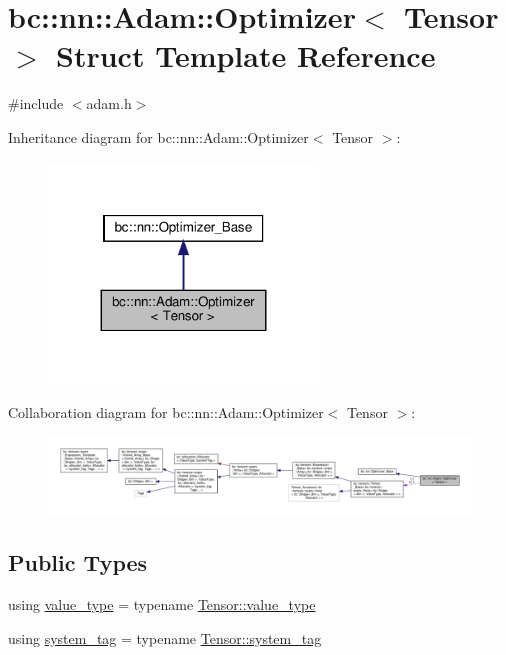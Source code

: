 \hypertarget{structbc_1_1nn_1_1Adam_1_1Optimizer}{}\section{bc\+:\+:nn\+:\+:Adam\+:\+:Optimizer$<$ Tensor $>$ Struct Template Reference}
\label{structbc_1_1nn_1_1Adam_1_1Optimizer}


{\ttfamily \#include $<$adam.\+h$>$}



Inheritance diagram for bc\+:\+:nn\+:\+:Adam\+:\+:Optimizer$<$ Tensor $>$\+:\nopagebreak
\begin{figure}[H]
\begin{center}
\leavevmode
\includegraphics[width=203pt]{structbc_1_1nn_1_1Adam_1_1Optimizer__inherit__graph}
\end{center}
\end{figure}


Collaboration diagram for bc\+:\+:nn\+:\+:Adam\+:\+:Optimizer$<$ Tensor $>$\+:\nopagebreak
\begin{figure}[H]
\begin{center}
\leavevmode
\includegraphics[width=350pt]{structbc_1_1nn_1_1Adam_1_1Optimizer__coll__graph}
\end{center}
\end{figure}
\subsection*{Public Types}
\begin{DoxyCompactItemize}
\item 
using \hyperlink{structbc_1_1nn_1_1Adam_1_1Optimizer_a6c0f45fad49cbec9368339576806cb75}{value\+\_\+type} = typename \hyperlink{classbc_1_1tensors_1_1Tensor__Base_ae7e5c0119f62f43ef74c5a463d3eaf13}{Tensor\+::value\+\_\+type}
\item 
using \hyperlink{structbc_1_1nn_1_1Adam_1_1Optimizer_aaa59035413615a398b1a0b8738078a54}{system\+\_\+tag} = typename \hyperlink{classbc_1_1tensors_1_1Tensor__Base_aef100d466be9075c6682ae9a2d2bd66d}{Tensor\+::system\+\_\+tag}
\end{DoxyCompactItemize}
